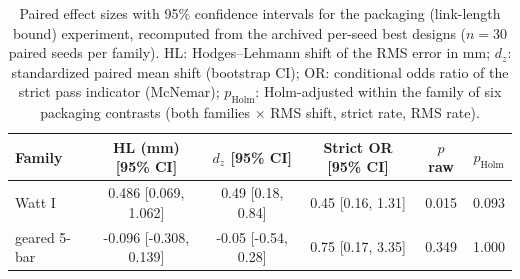 \begin{table}[H]
\caption{Paired effect sizes with 95\% confidence intervals for the packaging (link-length bound) experiment, recomputed from the archived per-seed best designs ($n=30$ paired seeds per family). HL: Hodges--Lehmann shift of the RMS error in mm; $d_z$: standardized paired mean shift (bootstrap CI); OR: conditional odds ratio of the strict pass indicator (McNemar); $p_{\mathrm{Holm}}$: Holm-adjusted within the family of six packaging contrasts (both families $\times$ RMS shift, strict rate, RMS rate).}
\label{tab:packaging_effects}
\centering
\begin{tabular}{@{}lccccc@{}}
\hline
Family & HL (mm) [95\% CI] & $d_z$ [95\% CI] & Strict OR [95\% CI] & $p$ raw & $p_{\mathrm{Holm}}$ \\
\hline
Watt I & 0.486 [0.069, 1.062] & 0.49 [0.18, 0.84] & 0.45 [0.16, 1.31] & 0.015 & 0.093 \\
geared 5-bar & -0.096 [-0.308, 0.139] & -0.05 [-0.54, 0.28] & 0.75 [0.17, 3.35] & 0.349 & 1.000 \\
\hline
\end{tabular}
\end{table}